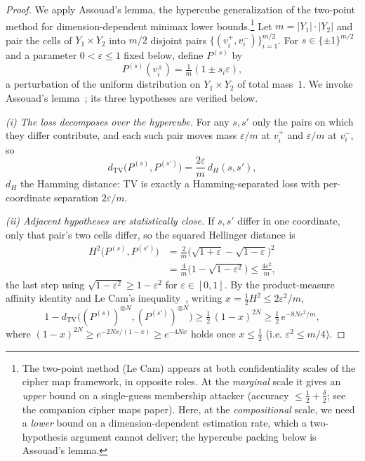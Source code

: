 \documentclass[conference]{IEEEtran}
\theoremstyle{definition}
\theoremstyle{plain}
\theoremstyle{remark}
\newcommand{\TV}{d_{\mathrm{TV}}}
\begin{document}
\begin{proof}
We apply Assouad's lemma, the hypercube generalization of the
two-point method for dimension-dependent minimax lower
bounds.\footnote{The
two-point method (Le Cam) appears at both confidentiality scales of
the cipher map framework, in opposite roles. At the \emph{marginal}
scale it gives an \emph{upper} bound on a single-guess membership
attacker (accuracy $\leq \tfrac12 + \tfrac\delta2$; see the companion
cipher maps paper). Here, at the \emph{compositional} scale, we need a
\emph{lower} bound on a dimension-dependent estimation rate, which a
two-hypothesis argument cannot deliver; the hypercube packing below is
Assouad's lemma.}  Let $m = |Y_1| \cdot |Y_2|$ and pair the cells of
$Y_1 \times Y_2$ into $m/2$ disjoint pairs
$\{(v_i^+, v_i^-)\}_{i=1}^{m/2}$.  For $s \in \{\pm 1\}^{m/2}$ and a
parameter $0 < \varepsilon \leq 1$ fixed below, define $P^{(s)}$ by
\[
P^{(s)}(v_i^{\pm}) = \tfrac{1}{m}(1 \pm s_i \varepsilon),
\]
a perturbation of the uniform distribution on $Y_1 \times Y_2$ of total
mass~$1$.  We invoke Assouad's
lemma~\cite[Thm.~2.12]{tsybakov2009nonparametric}; its three
hypotheses are verified below.

\emph{(i) The loss decomposes over the hypercube.}  For any
$s, s'$ only the pairs on which they differ contribute, and each such
pair moves mass $\varepsilon/m$ at $v_i^+$ and $\varepsilon/m$ at
$v_i^-$, so
\[
\TV\bigl(P^{(s)}, P^{(s')}\bigr)
  = \frac{2\varepsilon}{m}\, d_H(s, s'),
\]
$d_H$ the Hamming distance: TV is exactly a Hamming-separated loss with
per-coordinate separation $2\varepsilon/m$.

\emph{(ii) Adjacent hypotheses are statistically close.}  If $s, s'$
differ in one coordinate, only that pair's two cells differ, so the
squared Hellinger distance is
\[
\begin{aligned}
H^2\bigl(P^{(s)}, P^{(s')}\bigr)
  &= \frac{2}{m}\bigl(\sqrt{1+\varepsilon} - \sqrt{1-\varepsilon}\bigr)^2\\
  &= \frac{4}{m}\bigl(1 - \sqrt{1-\varepsilon^2}\bigr)
  \leq \frac{4\varepsilon^2}{m},
\end{aligned}
\]
the last step using $\sqrt{1-\varepsilon^2} \geq 1 - \varepsilon^2$ for
$\varepsilon \in [0,1]$.  By the product-measure affinity identity and
Le Cam's inequality~\cite[\S2.4]{tsybakov2009nonparametric}, writing
$x = \tfrac12 H^2 \leq 2\varepsilon^2/m$,
\[
1 - \TV\bigl((P^{(s)})^{\otimes N}, (P^{(s')})^{\otimes N}\bigr)
  \geq \tfrac12\,(1 - x)^{2N}
  \geq \tfrac12\, e^{-8 N \varepsilon^2 / m},
\]
where $(1-x)^{2N} \geq e^{-2Nx/(1-x)} \geq e^{-4Nx}$ holds once
$x \leq \tfrac12$ (i.e. $\varepsilon^2 \leq m/4$).


\end{proof}
\end{document}
